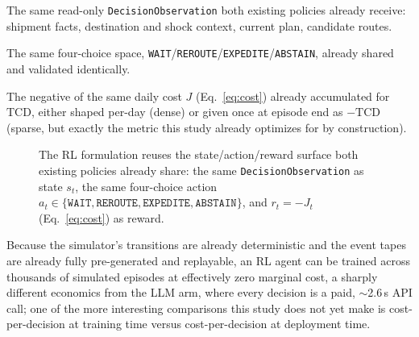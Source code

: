 \documentclass[10pt,twocolumn]{article}
\newcommand{\tcd}{\ensuremath{\mathrm{TCD}}}
\begin{document}
\begin{description}[leftmargin=1.2em,style=unboxed]
\item[State.] The same read-only \texttt{DecisionObservation} both existing policies already receive: shipment facts, destination and shock context, current plan, candidate routes.
\item[Action.] The same four-choice space, \texttt{WAIT}/\texttt{REROUTE}/\texttt{EXPEDITE}/\texttt{ABSTAIN}, already shared and validated identically.
\item[Reward.] The negative of the same daily cost $J$ (Eq.~\ref{eq:cost}) already accumulated for $\tcd$, either shaped per-day (dense) or given once at episode end as $-\tcd$ (sparse, but exactly the metric this study already optimizes for by construction).
\end{description}

\begin{figure}[t]
\centering
{}
\caption{The RL formulation reuses the state/action/reward surface both existing policies already share: the same \texttt{DecisionObservation} as state $s_t$, the same four-choice action $a_t \in \{\texttt{WAIT},\texttt{REROUTE},\texttt{EXPEDITE},\texttt{ABSTAIN}\}$, and $r_t=-J_t$ (Eq.~\ref{eq:cost}) as reward.}
\label{fig:rlloop}
\end{figure}

Because the simulator's transitions are already deterministic and the event tapes are already fully pre-generated and replayable, an RL agent can be trained across thousands of simulated episodes at effectively zero marginal cost, a sharply different economics from the LLM arm, where every decision is a paid, $\sim$2.6\,s API call; one of the more interesting comparisons this study does not yet make is cost-per-decision at training time versus cost-per-decision at deployment time.
\end{document}
